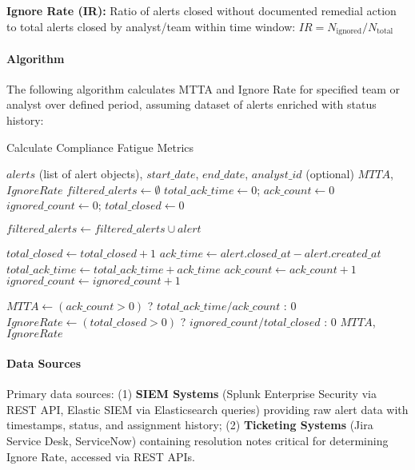 \documentclass[11pt, a4paper]{article}
\begin{document}
\textbf{Ignore Rate (IR):} Ratio of alerts closed without documented remedial action to total alerts closed by analyst/team within time window: $IR = N_{\text{ignored}} / N_{\text{total}}$

\paragraph{Algorithm}
The following algorithm calculates MTTA and Ignore Rate for specified team or analyst over defined period, assuming dataset of alerts enriched with status history:

\begin{algorithm}[H]
\caption{Calculate Compliance Fatigue Metrics}
\begin{algorithmic}[1]
\Require $alerts$ (list of alert objects), $start\_date$, $end\_date$, $analyst\_id$ (optional)
\Ensure $MTTA$, $IgnoreRate$
\State $filtered\_alerts \gets \emptyset$
\State $total\_ack\_time \gets 0$; $ack\_count \gets 0$
\State $ignored\_count \gets 0$; $total\_closed \gets 0$

            \State $filtered\_alerts \gets filtered\_alerts \cup alert$
        \EndIf
    \EndIf
\EndFor

        \State $total\_closed \gets total\_closed + 1$
        \State $ack\_time \gets alert.closed\_at - alert.created\_at$
        \State $total\_ack\_time \gets total\_ack\_time + ack\_time$
        \State $ack\_count \gets ack\_count + 1$
            \State $ignored\_count \gets ignored\_count + 1$
        \EndIf
    \EndIf
\EndFor

\State $MTTA \gets (ack\_count > 0)$ ? $total\_ack\_time / ack\_count$ : $0$
\State $IgnoreRate \gets (total\_closed > 0)$ ? $ignored\_count / total\_closed$ : $0$
\State \Return $MTTA$, $IgnoreRate$
\end{algorithmic}
\end{algorithm}

\paragraph{Data Sources}
Primary data sources: (1) \textbf{SIEM Systems} (Splunk Enterprise Security via REST API, Elastic SIEM via Elasticsearch queries) providing raw alert data with timestamps, status, and assignment history; (2) \textbf{Ticketing Systems} (Jira Service Desk, ServiceNow) containing resolution notes critical for determining Ignore Rate, accessed via REST APIs.
\end{document}
